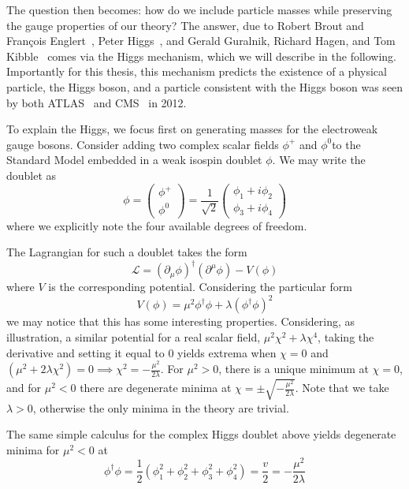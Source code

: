 The question then becomes: how do we include particle masses while preserving the gauge properties of our theory?
The answer, due to Robert Brout and François Englert~\cite{Englert}, Peter Higgs~\cite{Higgs}, and Gerald Guralnik, Richard Hagen, and Tom Kibble~\cite{GHK} comes via the Higgs mechanism, which we will describe in the following.
Importantly for this thesis, this mechanism predicts the existence of a physical particle, the Higgs boson, 
and a particle consistent with the Higgs boson was seen by both ATLAS~\cite{HIGG-2012-27} and 
CMS~\cite{CMS-HIG-12-028} in 2012.

To explain the Higgs, we focus first on generating masses for the electroweak gauge bosons. Consider adding two complex scalar fields $\phi^{+}$ and $\phi^{0}$to the Standard Model embedded in a 
weak isospin doublet $\phi$. We may write the doublet as
\begin{equation}
\phi = \begin{pmatrix}\phi^{+}\\\phi^{0}\end{pmatrix} = \frac{1}{\sqrt{2}}\begin{pmatrix}\phi_1+i\phi_2\\\phi_3+i\phi_4\end{pmatrix}
\end{equation}
where we explicitly note the four available degrees of freedom.

The Lagrangian for such a doublet takes the form
\begin{equation}
\mathcal{L} = (\partial_{\mu}\phi)^{\dagger}(\partial^{\mu}\phi) - V(\phi)
\end{equation}
where $V$ is the corresponding potential. Considering the particular form
\begin{equation}
V(\phi) = \mu^2\phi^{\dagger}\phi + \lambda(\phi^{\dagger}\phi)^2
\end{equation}
we may notice that this has some interesting properties. Considering, as illustration,
a similar potential for a real scalar field, $\mu^2\chi^2 +\lambda\chi^4$, taking the derivative
and setting it equal to 0 yields extrema when $\chi=0$ and $(\mu^2+2\lambda\chi^2) = 0 \implies \chi^2 = -\frac{\mu^2}{2\lambda}$.
For $\mu^2 > 0$, there is a unique minimum at $\chi=0$, and for $\mu^2 < 0$ there are 
degenerate minima at $\chi = \pm\sqrt{-\frac{\mu^2}{2\lambda}}$. Note that we take $\lambda > 0$, 
otherwise the only minima in the theory are trivial.

The same simple calculus for the complex Higgs doublet above yields degenerate minima for $\mu^2 < 0$ at
\begin{equation}
\phi^{\dagger}\phi = \frac{1}{2}(\phi_{1}^2+\phi_{2}^2+\phi_{3}^2+\phi_{4}^2) = \frac{v}{2}=-\frac{\mu^2}{2\lambda}
\end{equation}

